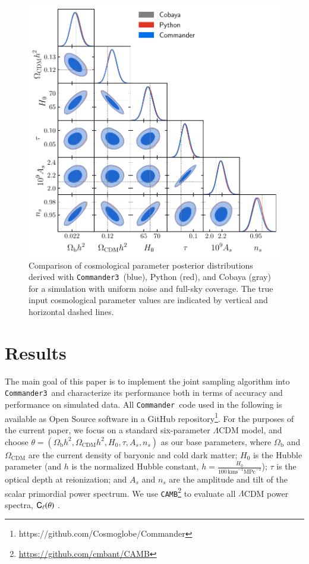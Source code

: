 \documentclass[twocolumn]{../common/aa}
\def\commander{\texttt{Commander}}
\def\commanderthree{\texttt{Commander3}}
\renewcommand{\C}[0]{\tens{C}}
\begin{document}
\begin{figure}
	\centering
	\includegraphics[width=\linewidth]{figures/dist_posterior_no_mask.pdf}
	\caption{\label{fig:nomask}Comparison of cosmological parameter posterior distributions derived with \commanderthree\ (blue), Python (red), and Cobaya (gray) for a simulation with uniform noise and full-sky coverage. The true input cosmological parameter values are indicated by vertical and horizontal dashed lines.}
\end{figure}


\section{Results}
\label{sec:results}

The main goal of this paper is to implement the joint sampling algorithm into \commanderthree\ and characterize its performance both in terms of accuracy and performance on simulated data. All \commander\ code used in the following is available as Open Source software in a GitHub repository\footnote{https://github.com/Cosmoglobe/Commander}. For the purposes of the current paper, we focus on a standard six-parameter $\Lambda$CDM model, and choose $\theta=(\Omega_{\textrm{b}}h^2, \Omega_{\textrm{CDM}}h^2, H_0, \tau, A_s, n_s)$ as our base parameters, where $\Omega_\mathrm{b}$ and $\Omega_\mathrm{CDM}$ are the current density of baryonic and cold dark matter; $H_0$ is the Hubble parameter (and $h$ is the normalized Hubble constant, $h=\frac{H_0}{100\,\mathrm{km s}^{-1} \mathrm{MPc}^{-1}}$); $\tau$ is the optical depth at reionization; and $A_s$ and $n_s$ are the amplitude and tilt of the scalar primordial power spectrum. We use \texttt{CAMB}\footnote{\url{https://github.com/cmbant/CAMB}} to evaluate all $\Lambda$CDM power spectra, $\C_{\ell}(\theta)$ \citep{Lewis:1999bs}.
\end{document}
